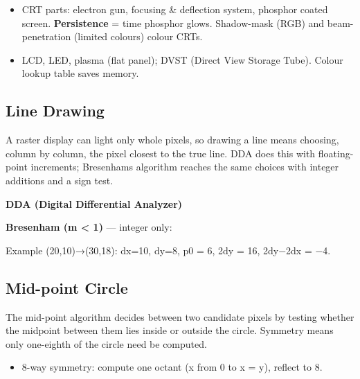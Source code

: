 \begin{itemize}
\tightlist
\item
  CRT parts: electron gun, focusing \& deflection system, phosphor coated screen. \textbf{Persistence} = time phosphor glows. Shadow-mask (RGB) and beam-penetration (limited colours) colour CRTs.
\item
  LCD, LED, plasma (flat panel); DVST (Direct View Storage Tube). Colour lookup table saves memory.
\end{itemize}

\needspace{155pt}

\hypertarget{p2-03--62-line-drawing}{%
\subsection{Line Drawing}\label{p2-03--62-line-drawing}}

A raster display can light only whole pixels, so drawing a line means choosing, column by column, the pixel
closest to the true line. DDA does this with floating-point increments; Bresenham\textquotesingle s algorithm reaches the
same choices with integer additions and a sign test.

\textbf{DDA (Digital Differential Analyzer)}



\textbf{Bresenham (\textbar m\textbar{} \textless{} 1)} --- integer only:



Example (20,10)→(30,18): dx=10, dy=8, p0 = 6, 2dy = 16, 2dy−2dx = −4.



\needspace{125pt}

\hypertarget{p2-03--63-mid-point-circle}{%
\subsection{Mid-point Circle}\label{p2-03--63-mid-point-circle}}

The mid-point algorithm decides between two candidate pixels by testing whether the midpoint between them
lies inside or outside the circle. Symmetry means only one-eighth of the circle need be computed.

\begin{itemize}
\tightlist
\item
  8-way symmetry: compute one octant (x from 0 to x = y), reflect to 8.
\end{itemize}

